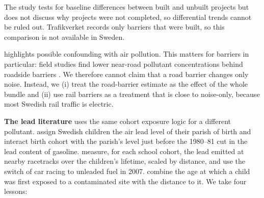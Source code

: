\documentclass[11pt]{article}
\begin{document}
The study tests for baseline differences between built and unbuilt projects but does not discuss why projects were not completed, so differential trends cannot be ruled out. Trafikverket records only barriers that were built, so this comparison is not available in Sweden.

\textbf{\textcite{greenhillNoisePollutionInfant2026}} highlights possible confounding with air pollution. This matters for barriers in particular: field studies find lower near-road pollutant concentrations behind roadside barriers \autocite{baldaufImpactsNoiseBarriers2008}. We therefore cannot claim that a road barrier changes only noise. Instead, we (i) treat the road-barrier estimate as the effect of the whole bundle and (ii) use rail barriers as a treatment that is close to noise-only, because most Swedish rail traffic is electric.

\textbf{The lead literature} uses the same cohort exposure logic for a different pollutant. \textcite{gronqvistUnderstandingHowLow2020} assign Swedish children the air lead level of their parish of birth and interact birth cohort with the parish's level just before the 1980--81 cut in the lead content of gasoline. \textcite{hollingsworthThousandCutsCumulative2025} measure, for each school cohort, the lead emitted at nearby racetracks over the children's lifetime, scaled by distance, and use the switch of car racing to unleaded fuel in 2007. \textcite{berkhoutLeadExposureCognitive2025} combine the age at which a child was first exposed to a contaminated site with the distance to it. We take four lessons:
\end{document}
